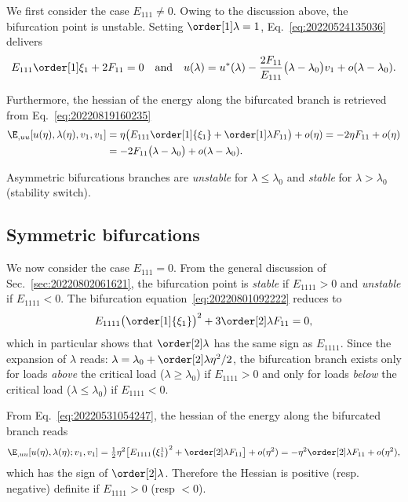 We first consider the case $E_{111} \neq 0$. Owing to the discussion above, the bifurcation point is unstable. Setting
$\order[1]\lambda = 1$, Eq.~\eqref{eq:20220524135036} delivers
\begin{equation}
  E_{111} \order[1]\xi_1 + 2F_{11} = 0 \quad \text{and} \quad u(\lambda) = u^\ast(\lambda) - \frac{2F_{11}}{E_{111}} \bigl( \lambda - \lambda_0 \bigr) v_1 + o(\lambda - \lambda_0).
\end{equation}

Furthermore, the hessian of the energy along the bifurcated branch is retrieved from Eq.~\eqref{eq:20220819160235}
\begin{equation}
  \begin{aligned}[b]
    \E_{, uu}[u(\eta), \lambda(\eta), v_1, v_1] &= \eta \bigl(E_{111} \order[1]{\xi_1} + \order[1]\lambda F_{11}\bigr) + o(\eta) = -2 \eta F_{11} + o(\eta)\\
    &= -2 F_{11} \bigl( \lambda - \lambda_0 \bigr) + o(\lambda - \lambda_0).
  \end{aligned}
\end{equation}

Asymmetric bifurcations branches are \emph{unstable} for $\lambda \leq \lambda_0$ and \emph{stable} for
$\lambda > \lambda_0$ (stability switch).

\subsection{Symmetric bifurcations}

We now consider the case $E_{111}=0$. From the general discussion of Sec.~\ref{sec:20220802061621}, the bifurcation
point is \emph{stable} if $E_{1111} > 0$ and \emph{unstable} if $E_{1111} < 0$. The bifurcation
equation~\eqref{eq:20220801092222} reduces to
\begin{equation}
  E_{1111} \bigl( \order[1]{\xi_1} \bigr)^2 + 3\order[2]\lambda F_{11} = 0,
\end{equation}
which in particular shows that $\order[2]\lambda$ has the same sign as $E_{1111}$. Since the expansion of $\lambda$
reads: $\lambda = \lambda_0 + \order[2]\lambda \eta^2 / 2$, the bifurcation branch exists only for loads \emph{above}
the critical load ($\lambda \geq \lambda_0$) if $E_{1111} > 0$ and only for loads \emph{below} the critical load
($\lambda \leq \lambda_0$) if $E_{1111} < 0$.

From Eq.~\eqref{eq:20220531054247}, the hessian of the energy along the bifurcated branch reads
\begin{equation*}
  \E_{, uu}[u(\eta), \lambda(\eta); v_1, v_1] = \tfrac{1}{2} \eta^2 \bigl[ E_{1111}\bigl(\xi_1^1\bigr) ^2 + \order[2]\lambda F_{11} \bigr] + o(\eta^2) = - \eta^2 \order[2]\lambda F_{11} + o(\eta^2),
\end{equation*}
which has the sign of $\order[2]\lambda$. Therefore the Hessian is positive (resp. negative) definite if $E_{1111} > 0$
(resp $< 0$).

